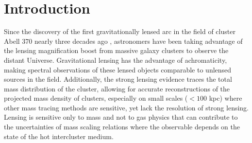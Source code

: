 \section{Introduction}
\label{chap3:sec:introduction}

Since the discovery of the first gravitationally lensed arc in the field of cluster Abell 370 nearly three decades ago \citep{Soucail:1988kx}, astronomers have been taking advantage of the lensing magnification boost from massive galaxy clusters to observe the distant Universe. Gravitational lensing has the advantage of achromaticity, making spectral observations of these lensed objects comparable to unlensed sources in the field. Additionally, the strong lensing evidence traces the total mass distribution of the cluster, allowing for accurate reconstructions of the projected mass density of clusters, especially on small scales ($<100$ kpc) where other mass tracing methods are sensitive, yet lack the resolution of strong lensing. Lensing is sensitive only to mass and not to gas physics that can contribute to the uncertainties of mass scaling relations where the observable depends on the state of the hot intercluster medium.

